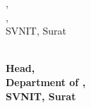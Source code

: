 {\begin{minipage}{0.49\textwidth}
{        \InternalSupervisorPosition{},\\
        \InternalSupervisorDept{},\\
        SVNIT, Surat\\
        }       
    \end{minipage}\begin{minipage}{0.49\textwidth}
        \begin{flushright}
            \textbf{\Hod{}\\
            Head,\\
            Department of \Subject{},\\
            SVNIT, Surat\\
           \\
            }
        \end{flushright}
    \end{minipage}
}
\newpage